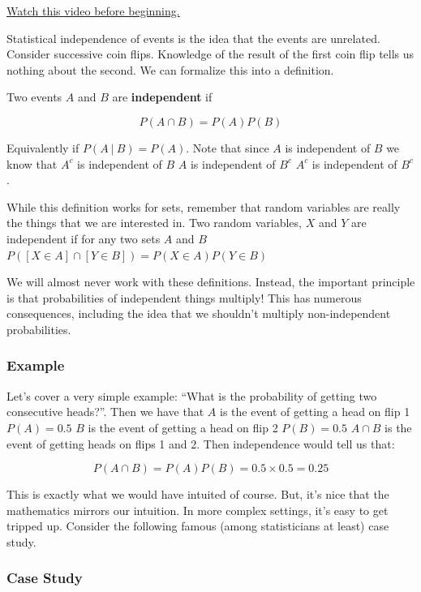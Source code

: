 \documentclass[]{article}
\begin{document}
\href{http://youtu.be/MY1EfrR1ZUs?list=PLpl-gQkQivXiBmGyzLrUjzsblmQsLtkzJ}{Watch
this video before beginning.}

Statistical independence of events is the idea that the events are
unrelated. Consider successive coin flips. Knowledge of the result of
the first coin flip tells us nothing about the second. We can formalize
this into a definition.

Two events $A$ and $B$ are \textbf{independent} if

\[P(A \cap B) = P(A)P(B)\]

Equivalently if $P(A ~|~ B) = P(A)$. Note that since $A$ is independent
of $B$ we know that $A^c$ is independent of $B$ $A$ is independent of
$B^c$ $A^c$ is independent of $B^c$.

While this definition works for sets, remember that random variables are
really the things that we are interested in. Two random variables, $X$
and $Y$ are independent if for any two sets $A$ and $B$
$P([X \in A] \cap [Y \in B]) = P(X\in A)P(Y\in B)$

We will almost never work with these definitions. Instead, the important
principle is that probabilities of independent things multiply! This has
numerous consequences, including the idea that we shouldn't multiply
non-independent probabilities.

\subsubsection{Example}\label{example-6}

Let's cover a very simple example: ``What is the probability of getting
two consecutive heads?''. Then we have that $A$ is the event of getting
a head on flip 1 $P(A) = 0.5$ $B$ is the event of getting a head on flip
2 $P(B) = 0.5$ $A \cap B$ is the event of getting heads on flips 1 and
2. Then independence would tell us that:

\[P(A \cap B) = P(A)P(B) = 0.5 \times 0.5 = 0.25\]

This is exactly what we would have intuited of course. But, it's nice
that the mathematics mirrors our intuition. In more complex settings,
it's easy to get tripped up. Consider the following famous (among
statisticians at least) case study.

\subsubsection{Case Study}\label{case-study}
\end{document}
